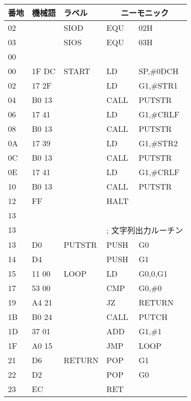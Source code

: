 \begin{center}
{\small\tt
\begin{tabular}{|l|l|l|l l|} \hline
番地 & 機械語 & ラベル & \multicolumn{2}{|c|}{ニーモニック} \\
\hline
02 &       &  SIOD   & EQU    & 02H             \\
03 &       &  SIOS   & EQU    & 03H             \\
00 &       &         &        &                 \\
00 & 1F DC & START   & LD     & SP,\#0DCH       \\
02 & 17 2F &         & LD     & G1,\#STR1       \\
04 & B0 13 &         & CALL   & PUTSTR          \\
06 & 17 41 &         & LD     & G1,\#CRLF       \\
08 & B0 13 &         & CALL   & PUTSTR          \\
0A & 17 39 &         & LD     & G1,\#STR2       \\
0C & B0 13 &         & CALL   & PUTSTR          \\
0E & 17 41 &         & LD     & G1,\#CRLF       \\
10 & B0 13 &         & CALL   & PUTSTR          \\
12 & FF    &         & HALT   &                 \\
13 &       &         &        &                 \\
13 &       &         & \multicolumn{2}{|l|}{; 文字列出力ルーチン} \\
13 & D0    &  PUTSTR & PUSH   & G0              \\
14 & D4    &         & PUSH   & G1              \\
15 & 11 00 &  LOOP   & LD     & G0,0,G1         \\
17 & 53 00 &         & CMP    & G0,\#0          \\
19 & A4 21 &         & JZ     & RETURN          \\
1B & B0 24 &         & CALL   & PUTCH           \\
1D & 37 01 &         & ADD    & G1,\#1          \\
1F & A0 15 &         & JMP    & LOOP            \\
21 & D6    &  RETURN & POP    & G1              \\
22 & D2    &         & POP    & G0              \\
23 & EC    &         & RET    &                 \\

\end{tabular}}
\end{center}

